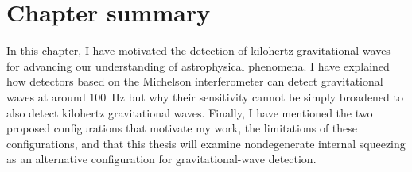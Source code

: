 


\section{Chapter summary}


In this chapter, I have motivated the detection of kilohertz gravitational waves for advancing our understanding of astrophysical phenomena. I have explained how detectors based on the Michelson interferometer can detect gravitational waves at around $100$~Hz but why their sensitivity cannot be simply broadened to also detect kilohertz gravitational waves. Finally, I have mentioned the two proposed configurations that motivate my work, the limitations of these configurations, and that this thesis will examine nondegenerate internal squeezing as an alternative configuration for gravitational-wave detection.



